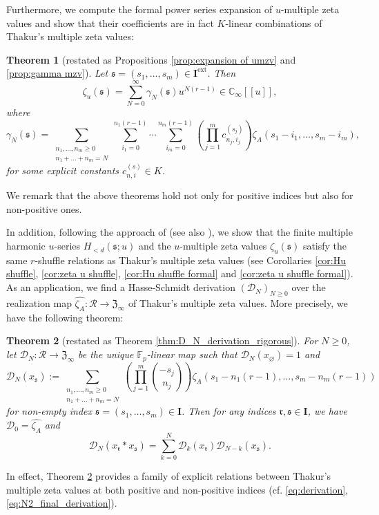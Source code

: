 \documentclass[12pt,reqno]{amsart}
\numberwithin{equation}{section}
\theoremstyle{plain}
\newtheorem{thm}{Theorem}[section]
\theoremstyle{definition}
\theoremstyle{remark}
\newcommand{\CC}{\mathbb{C}}
\newcommand{\FF}{\mathbb{F}}
\newcommand{\Dcal}{\mathcal{D}}
\newcommand{\Rcal}{\mathcal{R}}
\newcommand{\mbb}[1]{[\![{#1}]\!]}
\newcommand{\ww}[1]{\mathfrak{#1}}
\newcommand{\Ical}{\mathbf{I}}
\newcommand{\Zcal}{\mathfrak{Z}}
\newcommand{\ext}{\mathrm{ext}}
\begin{document}
Furthermore, we compute the formal power series expansion of $u$-multiple zeta values and show that their coefficients are in fact $K$-linear combinations of Thakur's multiple zeta values:

\begin{thm}[restated as Propositions \ref{prop:expansion of umzv} and \ref{prop:gamma mzv}]\label{thm:main3}
    Let $\ww{s}=(s_1,\ldots,s_m)\in\Ical^{\ext}$. Then
    $$\zeta_u(\ww{s}) = \sum_{N=0}^{\infty} \gamma_N(\ww{s}) u^{N(r-1)}\in\CC_\infty\mbb{u},$$
    where 
    $$\gamma_N(\ww{s}) = \sum_{\substack{n_1, \dots, n_m \ge 0 \\ n_1 + \dots + n_m = N}} \sum_{i_1=0}^{n_1(r-1)} \cdots \sum_{i_m=0}^{n_m(r-1)} \left( \prod_{j=1}^m c_{n_j,i_j}^{(s_j)} \right) \zeta_A(s_1-i_1, \dots, s_m-i_m),$$
    for some explicit constants $c_{n,i}^{(s)}\in K$.
\end{thm}

We remark that the above theorems hold not only for positive indices but also for non-positive ones.

In addition, following the approach of \cite{Shi2018} (see also \cite{Thakur2010}), we show that the finite multiple harmonic $u$-series $H_{<d}(\ww{s};u)$ and the $u$-multiple zeta values $\zeta_u(\ww{s})$ satisfy the same $r$-shuffle relations as Thakur's multiple zeta values (see Corollaries \ref{cor:Hu shuffle}, \ref{cor:zeta u shuffle}, \ref{cor:Hu shuffle formal} and \ref{cor:zeta u shuffle formal}). As an application, we find a Hasse-Schmidt derivation $(\Dcal_N)_{N\geq 0}$ over the realization map $\widehat{\zeta_A}:\Rcal\to\Zcal_\infty$ of Thakur's multiple zeta values. More precisely, we have the following theorem:
\begin{thm}[restated as Theorem \ref{thm:D_N_derivation_rigorous}]\label{thm:main4}
    For $N\geq 0$, let $\Dcal_N : \Rcal \to \Zcal_\infty$  be the unique $\FF_p$-linear map such that
    $\Dcal_N(x_{\varnothing})=1$
    and 
    $$\Dcal_N(x_{\ww{s}}) := \sum_{\substack{n_1, \ldots, n_m \ge 0 \\ n_1 + \dots + n_m = N}} \left( \prod_{j=1}^m \binom{-s_j}{n_j} \right) \zeta_A(s_1-n_1(r-1), \dots, s_m-n_m(r-1))$$
    for non-empty index $\ww{s}=(s_1,\ldots,s_m)\in\Ical$. Then
    for any indices $\ww{r}, \ww{s} \in \Ical$, we have $\Dcal_0=\widehat{\zeta_A}$ and
    $$\Dcal_N(x_{\ww{r}} \ast x_{\ww{s}}) = \sum_{k=0}^N \Dcal_k(x_{\ww{r}}) \Dcal_{N-k}(x_{\ww{s}}).$$
\end{thm}

In effect, Theorem \ref{thm:main4} provides a family of explicit relations between Thakur's multiple zeta values at both positive and non-positive indices (cf. \eqref{eq:derivation}, \eqref{eq:N2_final_derivation}).
\end{document}
